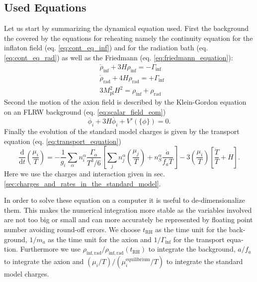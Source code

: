 \documentclass[master,       %
               twoside,        %
               BCOR10mm,       %
               english,ngerman, %
               ]{GAUBM}
\begin{document}
\begin{otherlanguage}{english}
\section{Used Equations}
Let us start by summarizing the dynamical equation used.
First the background the covered by the equations for reheating namely the continuity equation for the inflaton field (eq. \eqref{eq:cont_eq_inf}) and for the radiation bath (eq. \eqref{eq:cont_eq_rad}) as well as the Friedmann (eq. \eqref{eq:friedmann_equation}):
\begin{align}
	&\dot{\rho}_\mathrm{inf} + 3 H \rho_\mathrm{inf} = - \Gamma_\mathrm{inf} \nonumber \\
	&\dot{\rho}_\mathrm{rad} + 4 H \rho_\mathrm{rad} = + \Gamma_\mathrm{inf} \nonumber \\
	& 3 M_\mathrm{pl}^2 H^2 = \rho_\mathrm{inf} + \rho_\mathrm{rad}
\end{align}
Second the motion of the axion field is described by the Klein-Gordon equation on an FLRW background (eq. \eqref{eq:scalar_field_eom})
\begin{equation}
	\ddot{\phi_i} + 3 H \dot{\phi_i} + V'(\{\phi\}) = 0.
\end{equation}
Finally the evolution of the standard model charges is given by the transport equation (eq. \eqref{eq:transport_equation})
\begin{equation}
	\frac{\mathrm{d}}{\mathrm{d} t} \left( \frac{\mu_i}{T} \right) = - \frac{1}{g_i} \sum_\alpha n^\alpha_i \frac{\Gamma_\alpha}{T^3 / 6} \left[ \sum_j n_j^\alpha \left( \frac{\mu_j}{T} \right) + n_S^\alpha \frac{\dot{a}}{f_a T} \right] - 3 \left( \frac{\mu_i}{T} \right) \left[ \frac{\dot{T}}{T} + H \right].
\end{equation}
Here we use the charges and interaction given in sec. \ref{sec:charges_and_rates_in_the_standard_model}.

In order to solve these equation on a computer it is useful to de-dimensionalize them.
This makes the numerical integration more stable as the variables involved are not too big or small and can more accurately be represented by floating point number avoiding round-off errors.
We choose $t_\mathrm{RH}$ as the time unit for the background, $1 / m_a$ as the time unit for the axion and $1 / \Gamma_\mathrm{inf}$ for the transport equation.
Furthermore we use $\rho_{\mathrm{inf}, \mathrm{rad}} / \rho_{\mathrm{inf}, \mathrm{rad}}(t_\mathrm{RH})$ to integrate the background, $a / f_a$ to integrate the axion and $(\mu_i / T) / (\mu_i^\mathrm{equilibrium} / T)$ to integrate the standard model charges.


\end{otherlanguage}
\end{document}
